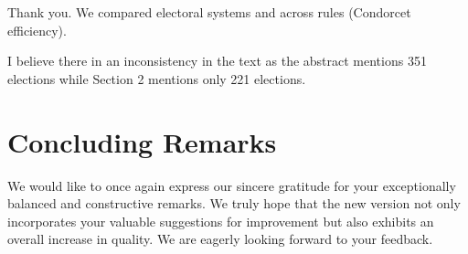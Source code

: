\documentclass[a4paper, 12pt]{scrartcl}
\theoremstyle{break}
\newenvironment{changes}{\par\color{violet}\par\addvspace{\baselineskip}}{\par\addvspace{\baselineskip}}
\begin{document}
Thank you. We compared electoral systems and across rules (Condorcet efficiency).

\begin{changes}
	I believe there in an inconsistency in the text as the abstract mentions 351 elections while Section 2 mentions only 221 elections.
\end{changes}




\newpage
\section{Concluding Remarks}

We would like to once again express our sincere gratitude for your exceptionally balanced and constructive remarks. We truly hope that the new version not only incorporates your valuable suggestions for improvement but also exhibits an overall increase in quality. We are eagerly looking forward to your feedback.



\end{document}
